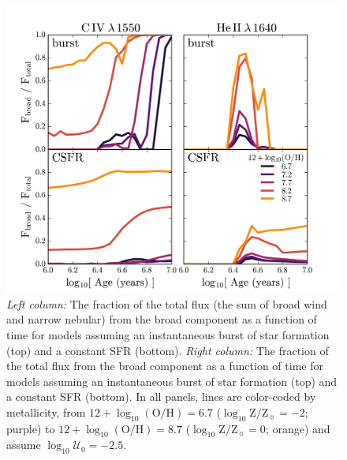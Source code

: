 \documentclass[trackchanges, preprint2]{aastex62}
\newcommand{\heii}{\ion{He}{2}}
\newcommand{\civ}{\ion{C}{4}}
\newcommand{\logten}{\ensuremath{\log_{10}}}
\newcommand{\logOH}{\ensuremath{\logten (\mathrm{O}/\mathrm{H})}\xspace}
\newcommand{\logZeq}[1]{\ensuremath{\logten \mathrm{Z}/\mathrm{Z}_{\sun} = #1}}
\newcommand{\logUeq}[1]{\ensuremath{\logten \mathcal{U}_0 = #1}}
\begin{document}
\begin{figure}
  \begin{center}
    \includegraphics[width=\linewidth]{figs/f7.png}
    \caption{\emph{Left column:} The fraction of the total \civ{} flux (the sum of broad wind and narrow nebular) from the broad component as a function of time for models assuming an instantaneous burst of star formation (top) and a constant SFR (bottom).  \emph{Right column:} The fraction of the total \heii{} flux from the broad component as a function of time for models assuming an instantaneous burst of star formation (top) and a constant SFR (bottom). In all panels, lines are color-coded by metallicity, from $12+\logOH=6.7$ (\logZeq{-2}; purple) to $12+\logOH=8.7$ (\logZeq{0}; orange) and assume \logUeq{-2.5}.}
    \label{fig:FracBroad}
  \end{center}
\end{figure}
\end{document}
